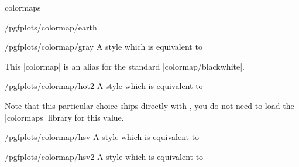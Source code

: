\begin{pgfplotslibrary}{colormaps}
\begin{stylekey}{/pgfplots/colormap/earth}

	\matlabcolormaptext
\end{stylekey}

\begin{stylekey}{/pgfplots/colormap/gray}
	A style which is equivalent to 
\begin{codeexample}
\end{codeexample}


	This |colormap| is an alias for the standard |colormap/blackwhite|.

	\matlabcolormaptext
\end{stylekey}

\begin{stylekey}{/pgfplots/colormap/hot2}
	A style which is equivalent to 
\begin{codeexample}
\end{codeexample}


	Note that this particular choice ships directly with \PGFPlots, you do not need to load the |colormaps| library for this value.

	\matlabcolormaptext
\end{stylekey}

\begin{stylekey}{/pgfplots/colormap/hsv}
	A style which is equivalent to 
\begin{codeexample}
\end{codeexample}


	\matlabcolormaptext
\end{stylekey}

\begin{stylekey}{/pgfplots/colormap/hsv2}
	A style which is equivalent to 
\begin{codeexample}
\end{codeexample}


\end{stylekey}
\end{pgfplotslibrary}
